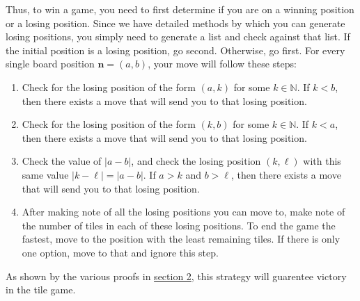 \documentclass[11pt, letterpaper]{article}
\begin{document}
Thus, to win a game, you need to first determine if you are on a winning position or a losing position. Since we have detailed methods by which you can generate losing positions, you simply need to generate a list and check against that list. If the initial position is a losing position, go second. Otherwise, go first. For every single board position $\mathbf{n}=(a,b)$, your move will follow these steps:
\begin{enumerate}
	\item Check for the losing position of the form $(a,k)$ for some $k\in\mathbb{N}$. If $k<b$, then there exists a move that will send you to that losing position.
	\item Check for the losing position of the form $(k,b)$ for some $k\in\mathbb{N}$. If $k<a$, then there exists a move that will send you to that losing position.
	\item Check the value of $\left| a-b \right| $, and check the losing position $(k,\ell )$ with this same value $\left| k-\ell  \right| =\left| a-b \right| $. If $a>k$ and $b>\ell $, then there exists a move that will send you to that losing position.
	\item After making note of all the losing positions you can move to, make note of the number of tiles in each of these losing positions. To end the game the fastest, move to the position with the least remaining tiles. If there is only one option, move to that and ignore this step.
\end{enumerate}

As shown by the various proofs in \hyperref[sec:2]{section 2}, this strategy will guarentee victory in the tile game.
\end{document}
